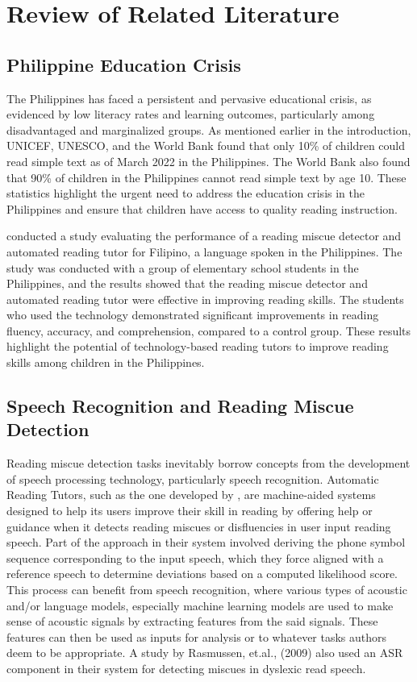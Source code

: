 \chapter{Review of Related Literature}
\label{sec:relatedlit}

\section{Philippine Education Crisis}
The Philippines has faced a persistent and pervasive educational crisis, as evidenced by low literacy rates and learning outcomes, particularly among disadvantaged and marginalized groups. As mentioned earlier in the introduction, UNICEF, UNESCO, and the World Bank found that only 10\% of children could read simple text as of March 2022 in the Philippines. The World Bank also found that 90\% of children in the Philippines cannot read simple text by age 10. These statistics highlight the urgent need to address the education crisis in the Philippines and ensure that children have access to quality reading instruction.

\citeauthor{pascual-2017} \citeyear{pascual-2017} conducted a study evaluating the performance of a reading miscue detector and automated reading tutor for Filipino, a language spoken in the Philippines. The study was conducted with a group of elementary school students in the Philippines, and the results showed that the reading miscue detector and automated reading tutor were effective in improving reading skills. The students who used the technology demonstrated significant improvements in reading fluency, accuracy, and comprehension, compared to a control group. These results highlight the potential of technology-based reading tutors to improve reading skills among children in the Philippines.


\section{Speech Recognition and Reading Miscue Detection}
Reading miscue detection tasks inevitably borrow concepts from the development of speech processing technology, particularly speech recognition. Automatic Reading Tutors, such as the one developed by \citeauthor{pascual-2017} \citeyear{pascual-2017}, are machine-aided systems designed to help its users improve their skill in reading by offering help or guidance when it detects reading miscues or disfluencies in user input reading speech. Part of the approach in their system involved deriving the phone symbol sequence corresponding to the input speech, which they force aligned with a reference speech to determine deviations based on a computed likelihood score. This process can benefit from speech recognition, where various types of acoustic and/or language models, especially machine learning models are used to make sense of acoustic signals by extracting features from the said signals. These features can then be used as inputs for analysis or to whatever tasks authors deem to be appropriate. A study by Rasmussen, et.al., (2009) also used an ASR component in their system for detecting miscues in dyslexic read speech.

